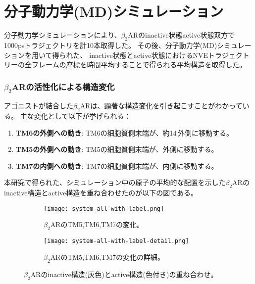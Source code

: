 \section{分子動力学(MD)シミュレーション}

分子動力学シミュレーションにより、$\beta_2$ARのinactive状態active状態双方で1000psトラジェクトリを計10本取得した。
その後、分子動力学(MD)シミュレーションを用いて得られた、
inactive状態とactive状態におけるNVEトラジェクトリーの全フレームの座標を時間平均することで得られる平均構造を取得した。

\subsubsection{$\beta_2$ARの活性化による構造変化}
アゴニストが結合した$\beta_2$ARは、顕著な構造変化を引き起こす\cite{rasmussen2011crystal}\cite{poudel2021activation}ことがわかっている。
主な変化として以下が挙げられる：
\begin{enumerate}
    \item \textbf{TM6の外側への動き}: TM6の細胞質側末端が、約14\,\text{\AA}外側に移動する。
    \item \textbf{TM5の外側への動き}: TM5の細胞質側末端が、外側に移動する。
    \item \textbf{TM7の内側への動き}: TM7の細胞質側末端が、内側に移動する。
\end{enumerate}

本研究で得られた、シミュレーション中の原子の平均的な配置を示した$\beta_2$ARのinactive構造とactive構造を重ね合わせたのが以下の図である。
\begin{figure}[htbp]
  \centering
  \begin{subfigure}{0.88\textwidth} %
    \centering
    \texttt{[image: system-all-with-label.png]}
    \caption{$\beta_2$ARのTM5,TM6,TM7の変化。}
    \label{fig:fitting_TM}
  \end{subfigure}
  \hspace{0.02\textwidth} %
  \begin{subfigure}{0.88\textwidth}
    \centering
    \texttt{[image: system-all-with-label-detail.png]}
    \caption{$\beta_2$ARのTM5,TM6,TM7の変化の詳細。}
    \label{fig:fitting_TM_detail}
  \end{subfigure}
  \caption{$\beta_2$ARのinactive構造(灰色)とactive構造(色付き)の重ね合わせ。}
  \label{fig:fitting-all}
\end{figure}

